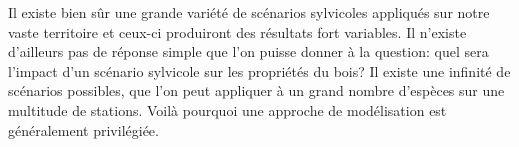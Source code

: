 Il existe bien sûr une grande variété de scénarios sylvicoles appliqués sur notre vaste territoire et ceux-ci produiront des résultats fort variables. Il n'existe d'ailleurs pas de réponse simple que l'on puisse donner à la question: quel sera l'impact d'un scénario sylvicole sur les propriétés du bois? Il existe une infinité de scénarios possibles, que l'on peut appliquer à un grand nombre d'espèces sur une multitude de stations. Voilà pourquoi une approche de modélisation est généralement privilégiée.
